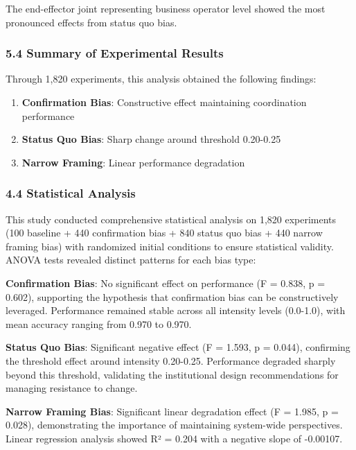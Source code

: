 The end-effector joint representing business operator level showed the
most pronounced effects from status quo bias.

\subsubsection{5.4 Summary of Experimental
Results}\label{summary-of-experimental-results}

Through 1,820 experiments, this analysis obtained the following
findings:

\begin{enumerate}
\def\labelenumi{\arabic{enumi}.}
\tightlist
\item
  \textbf{Confirmation Bias}: Constructive effect maintaining
  coordination performance
\item
  \textbf{Status Quo Bias}: Sharp change around threshold 0.20-0.25
\item
  \textbf{Narrow Framing}: Linear performance degradation
\end{enumerate}

\subsubsection{4.4 Statistical Analysis}\label{statistical-analysis}

This study conducted comprehensive statistical analysis on 1,820
experiments (100 baseline + 440 confirmation bias + 840 status quo bias
+ 440 narrow framing bias) with randomized initial conditions to ensure
statistical validity. ANOVA tests revealed distinct patterns for each
bias type:

\textbf{Confirmation Bias}: No significant effect on performance (F =
0.838, p = 0.602), supporting the hypothesis that confirmation bias can
be constructively leveraged. Performance remained stable across all
intensity levels (0.0-1.0), with mean accuracy ranging from 0.970 to
0.970.

\textbf{Status Quo Bias}: Significant negative effect (F = 1.593, p =
0.044), confirming the threshold effect around intensity 0.20-0.25.
Performance degraded sharply beyond this threshold, validating the
institutional design recommendations for managing resistance to change.

\textbf{Narrow Framing Bias}: Significant linear degradation effect (F =
1.985, p = 0.028), demonstrating the importance of maintaining
system-wide perspectives. Linear regression analysis showed R² = 0.204
with a negative slope of -0.00107.


